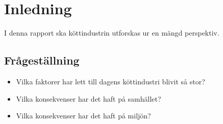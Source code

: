 \section{Inledning}
I denna rapport ska köttindustrin utforskas ur en mängd perspektiv.

\subsection{Frågeställning}
\begin{itemize}
	\item Vilka faktorer har lett till dagens köttindustri blivit så stor?
	\item Vilka konsekvenser har det haft på samhället? 
	\item Vilka konsekvenser har det haft på miljön?

\end{itemize}